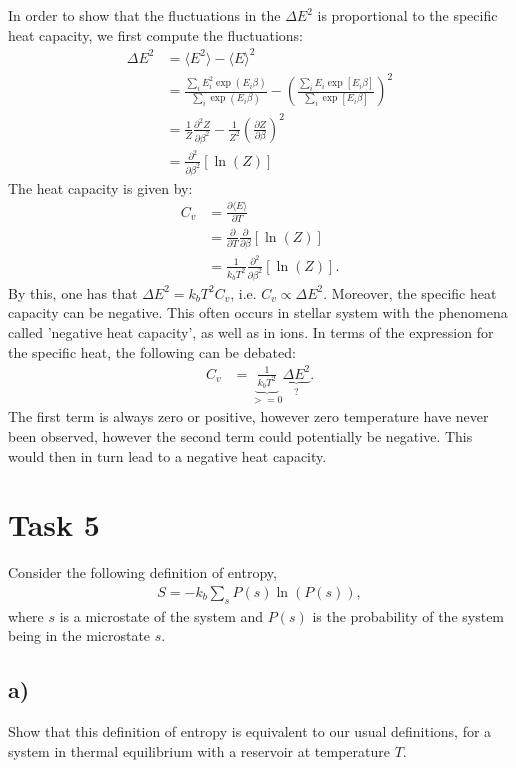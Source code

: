 \documentclass[a4paper]{article}
\newcommand{\average}[1]{\langle #1 \rangle}
\newcommand{\newparagraph}{\vspace{.5cm}\noindent}
\begin{document}
\newparagraph
In order to show that the fluctuations in the $\Delta E^2$ is proportional to the specific heat capacity, we first compute the fluctuations:
\begin{align*}
    \Delta E^2 &= \average{E^2} - \average{E}^2\\
    &= \frac{\sum_i E_i^2\exp\left(E_i\beta\right)}{\sum_i\exp\left(E_i\beta\right)} - \left(\frac{\sum_i E_i\exp\left[E_i\beta\right]}{\sum_i \exp\left[E_i\beta\right]}\right)^2\\
    &= \frac{1}{Z}\frac{\partial^2Z}{\partial\beta^2}-\frac{1}{Z^2}\left(\frac{\partial Z}{\partial \beta}\right)^2\\
    &= \frac{\partial^2}{\partial\beta^2}\left[\ln(Z)\right]
\end{align*}The heat capacity is given by:
\begin{align*}
    C_v &= \frac{\partial \average{E}}{\partial T} \\
    &= \frac{\partial}{\partial T}\frac{\partial}{\partial \beta}\left[\ln(Z)\right]\\
    &=\frac{1}{k_b T^2}\frac{\partial^2}{\partial \beta^2}\left[\ln(Z)\right].
\end{align*}By this, one has that $\Delta E^2 = k_b T^2 C_v$, i.e. $C_v \propto \Delta E^2$. Moreover, the specific heat capacity can be negative. This often occurs in stellar system with the phenomena called 'negative heat capacity', as well as in ions.
In terms of the expression for the specific heat, the following can be debated:
\begin{align*}
    C_v &= \underbrace{\frac{1}{k_bT^2}}_{>= 0}\underbrace{\Delta E^2}_{?}.
\end{align*}The first term is always zero or positive, however zero temperature have never been observed, however the second term could potentially be negative. This would then in turn lead to a negative heat capacity.


\section*{Task 5}
Consider the following definition of entropy,
\begin{align}
    S = -k_b\sum_s P(s)\ln(P(s)),\label{eq: Entropy def}
\end{align}where $s$ is a microstate of the system and $P(s)$ is the probability of the system being in the microstate $s$.

\subsection*{a)}
Show that this definition of entropy is equivalent to our usual definitions, for a system in thermal equilibrium with a reservoir at temperature $T$.
\end{document}
